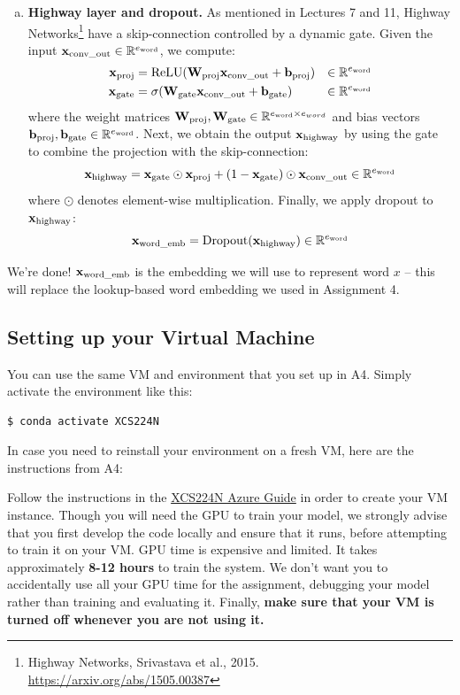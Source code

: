 \begin{enumerate}[(a)]
    \item \textbf{Highway layer and dropout.}
    As mentioned in Lectures 7 and 11, Highway Networks\footnote{Highway Networks, Srivastava et al., 2015. \url{https://arxiv.org/abs/1505.00387}} have a skip-connection controlled by a dynamic gate. Given the input $\mathbf{x}_\text{conv\_out} \in \mathbb{R}^{e_\text{word}}$, we compute:
    \begin{align}
        \mathbf{x}_{\text{proj}} &= \operatorname{ReLU}(\mathbf{W}_{\text{proj}} \mathbf{x}_\text{conv\_out} + \mathbf{b}_{\text{proj}}) &\in \mathbb{R}^{e_\text{word}} \\
        \mathbf{x}_{\text{gate}} &= \sigma(\mathbf{W}_\text{gate} \mathbf{x}_\text{conv\_out} + \mathbf{b}_\text{gate}) &\in \mathbb{R}^{e_\text{word}}
    \end{align}
    where the weight matrices $\mathbf{W}_\text{proj}, \mathbf{W}_\text{gate} \in \mathbb{R}^{e_\text{word} \times e_{word}}$ and bias vectors $\mathbf{b}_\text{proj}, \mathbf{b}_\text{gate} \in \mathbb{R}^{e_\text{word}}$. 
    Next, we obtain the output $\mathbf{x}_\text{highway}$ by using the gate to combine the projection with the skip-connection:
    \begin{equation}
    \mathbf{x}_\text{highway} = \mathbf{x}_\text{gate} \odot \mathbf{x}_\text{proj} + (1-\mathbf{x}_\text{gate}) \odot \mathbf{x}_\text{conv\_out} \in \mathbb{R}^{e_\text{word}}
    \end{equation}
    where $\odot$ denotes element-wise multiplication.
    Finally, we apply dropout to $\mathbf{x}_\text{highway}$:
    \begin{equation}
        \mathbf{x}_\text{word\_emb} = \text{Dropout}(\mathbf{x}_\text{highway}) \in \mathbb{R}^{e_\text{word}}
    \end{equation}
\end{enumerate}
We're done! $\mathbf{x}_\text{word\_emb}$ is the embedding we will use to represent word $x$ -- this will replace the lookup-based word embedding we used in Assignment 4.
\newpage

\subsection*{{\color{red} Setting up your Virtual Machine}}
You can use the same VM and environment that you set up in A4.  Simply activate the environment like this:
\begin{lstlisting}
$ conda activate XCS224N
\end{lstlisting}
In case you need to reinstall your environment on a fresh VM, here are the instructions from A4:

Follow the instructions in the \href{https://docs.google.com/document/d/10J520Vnb1LnAMo0qgSYpG5cEEbomqQ371NIqg1IAv-4/edit?usp=sharing}{XCS224N Azure Guide} in order to create your VM instance. Though you will need the GPU to train your model, we strongly advise that you first develop the code locally and ensure that it runs, before attempting to train it on your VM. GPU time is expensive and limited. It takes approximately \textbf{8-12 hours} to train the system. We don't want you to accidentally use all your GPU time for the assignment, debugging your model rather than training and evaluating it. Finally, \textbf{make sure that your VM is turned off whenever you are not using it.}

